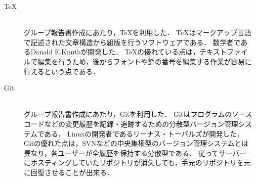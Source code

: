 \documentclass[../report]{subfiles}
\begin{document}
\begin{description}
    \item[TeX] \mbox{} \\
        グループ報告書作成にあたり，TeXを利用した．
        TeXはマークアップ言語で記述された文章構造から組版を行うソフトウェアである．
        数学者であるDonald E.Knuthが開発した．
        TeXの優れている点は，テキストファイルで編集を行うため，後からフォントや節の番号を編集する作業が容易に行えるという点である．
    \item[Git] \mbox{} \\
        グループ報告書作成にあたり，Gitを利用した．
        Gitはプログラムのソースコードなどの変更履歴を記録・追跡するための分散型バージョン管理システムである．
        Linuxの開発者であるリーナス・トーバルズが開発した．
        Gitの優れた点は，SVNなどの中央集権型のバージョン管理システムとは異なり，各ユーザーが全履歴を保持する分散型である．
        従ってサーバーにホスティングしていたリポジトリが消失しても，手元のリポジトリを元に回復させることが出来る．
\end{description}
\end{document}
